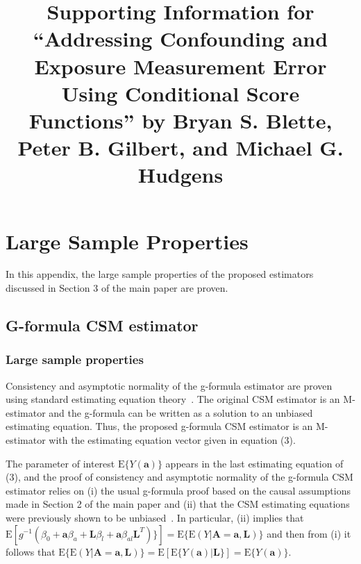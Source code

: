 \documentclass[12pt]{article}
\title{Supporting Information for ``Addressing Confounding and Exposure Measurement Error Using Conditional Score Functions'' by Bryan S. Blette, Peter B. Gilbert, and Michael G. Hudgens}
\date{}
\begin{document}


\maketitle

\section{Large Sample Properties}

In this appendix, the large sample properties of the proposed estimators discussed in Section 3 of the main paper are proven.

\subsection{G-formula CSM estimator}

\subsubsection{Large sample properties}

Consistency and asymptotic normality of the g-formula estimator are proven using standard estimating equation theory~\citep{stefanski2002}. The original CSM estimator is an M-estimator and the g-formula can be written as a solution to an unbiased estimating equation. Thus, the proposed g-formula CSM estimator is an M-estimator with the estimating equation vector given in equation (3).

The parameter of interest $\text{E} \{ Y(\bm{a}) \}$ appears in the last estimating equation of (3), and the proof of consistency and asymptotic normality of the g-formula CSM estimator relies on (i) the usual g-formula proof based on the causal assumptions made in Section 2 of the main paper and (ii) that the CSM estimating equations were previously shown to be unbiased~\citep{carroll2006}. In particular, (ii) implies that $\text{E}[g^{-1}(\beta_{0} + \bm{a}\beta_{a} + \bm{L}\beta_{l} + \bm{a}\beta_{al}\bm{L}^{T}) \}] = \text{E} \{ \text{E}(Y | \bm{A} = \bm{a}, \bm{L}) \}$ and then from (i) it follows that $\text{E} \{ \text{E}(Y | \bm{A} = \bm{a}, \bm{L}) \} = \text{E}[\text{E} \{ Y(\bm{a}) | \bm{L} \}] = \text{E} \{ Y(\bm{a}) \}$.
\end{document}
